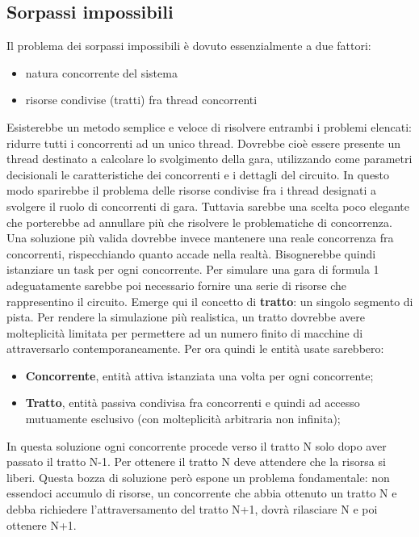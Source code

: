\subsection{Sorpassi impossibili}
\label{sorpassi_impossibili_soluzioni}
Il problema dei sorpassi impossibili è dovuto essenzialmente a due fattori:
\begin{itemize}
\item natura concorrente del sistema
\item risorse condivise (tratti) fra thread concorrenti
\end{itemize}
Esisterebbe un metodo semplice e veloce di risolvere entrambi i problemi
elencati: ridurre tutti i concorrenti ad un unico thread.
Dovrebbe cioè essere presente un thread destinato a calcolare lo svolgimento
della gara, utilizzando come  parametri decisionali
le caratteristiche dei concorrenti e i dettagli del circuito. In questo modo
sparirebbe il problema delle risorse condivise fra
i thread designati a svolgere il ruolo di concorrenti di gara. Tuttavia sarebbe
una scelta poco elegante che porterebbe
ad annullare più che risolvere le problematiche di concorrenza.\\
Una soluzione più valida dovrebbe invece mantenere una reale concorrenza fra
concorrenti, rispecchiando quanto accade nella realtà.
Bisognerebbe quindi istanziare un task per ogni concorrente. Per simulare una
gara di formula 1 adeguatamente sarebbe poi necessario
fornire una serie di risorse che rappresentino il circuito. Emerge qui il
concetto di \textbf{tratto}: un singolo segmento di pista.
Per rendere la simulazione più realistica, un tratto dovrebbe avere molteplicità
limitata per permettere ad un numero finito di macchine
di attraversarlo contemporaneamente. Per ora quindi le entità usate sarebbero:
\begin{itemize}
\item \textbf{Concorrente}, entità attiva istanziata una volta per ogni
concorrente;
\item \textbf{Tratto}, entità passiva condivisa fra concorrenti e quindi ad
accesso mutuamente esclusivo (con molteplicità arbitraria non infinita);
\end{itemize}
In questa soluzione ogni concorrente procede verso il tratto N solo dopo aver
passato il tratto N-1. Per ottenere il tratto N deve attendere
che la risorsa si liberi. Questa bozza di soluzione però espone un problema
fondamentale: non essendoci accumulo di risorse,
un concorrente che abbia ottenuto un tratto N e debba richiedere
l'attraversamento del tratto N+1, dovrà rilasciare N e poi ottenere N+1.
